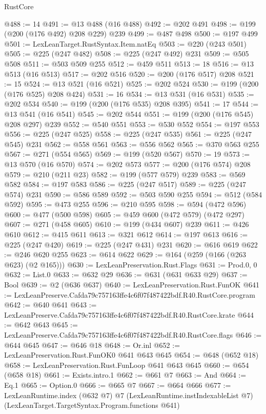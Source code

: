 \begin{lexlean}{RustCore}
\begin{coremodule}
@488 := 14
@491 := @13 @488 (@16 @488)
@492 := @202 @491
@498 := @199 (@200 (@176 @492) @208 @229) @239
@499 := @487 @498
@500 := @197 @499
@501 := LexLeanTarget.RustSyntax.Item.natEq
@503 := @220 (@243 @501)
@505 := @225 (@247 @482)
@508 := @225 (@247 @492) @231
@509 := @505 @508
@511 := @503 @509 @255
@512 := @459 @511
@513 := 18
@516 := @13 @513 (@16 @513)
@517 := @202 @516
@520 := @200 (@176 @517) @208
@521 := 15
@524 := @13 @521 (@16 @521)
@525 := @202 @524
@530 := @199 (@200 (@176 @525) @208 @424)
@531 := 16
@534 := @13 @531 (@16 @531)
@535 := @202 @534
@540 := @199 (@200 (@176 @535) @208 @395)
@541 := 17
@544 := @13 @541 (@16 @541)
@545 := @202 @544
@551 := @199 (@200 (@176 @545) @208 @297) @239
@552 := @540 @551
@553 := @530 @552
@554 := @197 @553
@556 := @225 (@247 @525)
@558 := @225 (@247 @535)
@561 := @225 (@247 @545) @231
@562 := @558 @561
@563 := @556 @562
@565 := @370 @563 @255
@567 := @271 (@554 @565)
@569 := @199 (@520 @567)
@570 := 19
@573 := @13 @570 (@16 @570)
@574 := @202 @573
@577 := @200 (@176 @574) @208
@579 := @210 (@211 @23)
@582 := @199 (@577 @579) @239
@583 := @569 @582
@584 := @197 @583
@586 := @225 (@247 @517)
@589 := @225 (@247 @574) @231
@590 := @586 @589
@592 := @503 @590 @255
@594 := @512 (@584 @592)
@595 := @473 @255
@596 := @210 @595
@598 := @594 (@472 @596)
@600 := @477 (@500 @598)
@605 := @459 @600 (@472 @579) (@472 @297)
@607 := @271 (@458 @605)
@610 := @199 (@434 @607) @239
@611 := @426 @610
@612 := @415 @611
@613 := @321 @612
@614 := @197 @613
@616 := @225 (@247 @420)
@619 := @225 (@247 @431) @231
@620 := @616 @619
@622 := @246 @620 @255
@623 := @614 @622
@629 := @164 (@259 (@166 (@263 @623) (@2 @165)))
@630 := LexLeanPreservation.Rust.Flags
@631 := Prod.{0, 0}
@632 := List.{0}
@633 := @632 @29
@636 := @631 (@631 @633 @29)
@637 := Bool
@639 := @2 (@636 @637)
@640 := LexLeanPreservation.Rust.FunOK
@641 := LexLeanPreserve.Cafda79c757163ffe4c6f07f487422bdf.R40.RustCore.program
@642 := @640 @641
@643 := LexLeanPreserve.Cafda79c757163ffe4c6f07f487422bdf.R40.RustCore.krate
@644 := @642 @643
@645 := LexLeanPreserve.Cafda79c757163ffe4c6f07f487422bdf.R40.RustCore.flags
@646 := @644 @645
@647 := @646 @18
@648 := Or.inl
@652 := LexLeanPreservation.Rust.FunOK0 @641 @643 @645
@654 := @648 (@652 @18)
@658 := LexLeanPreservation.Rust.FunLoop @641 @643 @645
@660 := @654 (@658 @18)
@661 := Exists.intro.{1}
@662 := @661 @7
@663 := And
@664 := Eq.{1}
@665 := Option.{0}
@666 := @665 @7
@667 := @664 @666
@677 := LexLeanRuntime.index
    (@632 @7)
    @7
    (LexLeanRuntime.instIndexableList @7)
    (LexLeanTarget.TargetSyntax.Program.functions @641)

\end{coremodule}
\end{lexlean}
